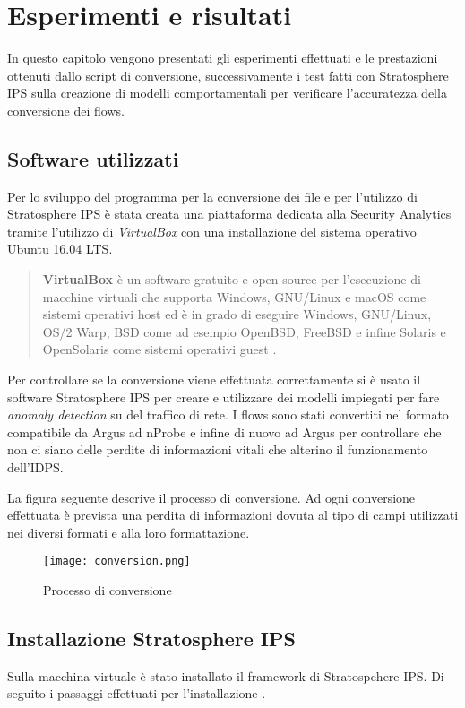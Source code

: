 \documentclass[../main.tex]{subfiles}
\begin{document}
\chapter{Esperimenti e risultati}

In questo capitolo vengono presentati gli esperimenti effettuati e le prestazioni ottenuti dallo script di conversione, successivamente i test fatti con Stratosphere IPS sulla creazione di modelli comportamentali per verificare l'accuratezza della conversione dei flows.

\section{Software utilizzati}

Per lo sviluppo del programma per la conversione dei file e per l'utilizzo di Stratosphere IPS è stata creata una piattaforma dedicata alla Security Analytics tramite l'utilizzo di \textit{VirtualBox} con una installazione del sistema operativo Ubuntu 16.04 LTS.


\begin{verse}
				\textbf{VirtualBox} è un software gratuito e open source per l'esecuzione di macchine virtuali che supporta Windows, GNU/Linux e macOS come sistemi operativi host ed è in grado di eseguire Windows, GNU/Linux, OS/2 Warp, BSD come ad esempio OpenBSD, FreeBSD e infine Solaris e OpenSolaris come sistemi operativi guest \cite{virtualbox}. 
\end{verse}

Per controllare se la conversione viene effettuata correttamente si è usato il software Stratosphere IPS per creare e utilizzare dei modelli impiegati per fare \textit{anomaly detection} su del traffico di rete. I flows sono stati convertiti nel formato compatibile da Argus ad nProbe e infine di nuovo ad Argus per controllare che non ci siano delle perdite di informazioni vitali che alterino il funzionamento dell'IDPS.

La figura seguente descrive il processo di conversione. Ad ogni conversione effettuata è prevista una perdita di informazioni dovuta al tipo di campi utilizzati nei diversi formati e alla loro formattazione.

\begin{figure}[H]
				\centering
				\texttt{[image: conversion.png]}
				\caption{Processo di conversione}
\end{figure}

\section{Installazione Stratosphere IPS}
Sulla macchina virtuale è stato installato il framework di Stratospehere IPS. Di seguito i passaggi effettuati per l'installazione \cite{stf}.
\end{document}
